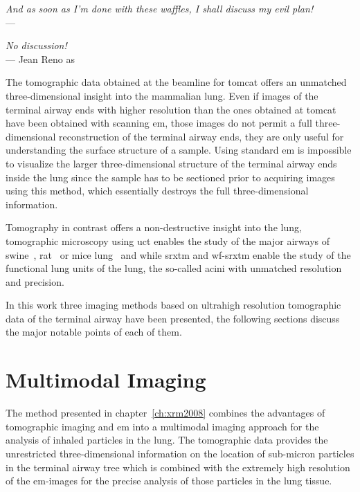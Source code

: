 \acresetall
{}\label{ch:discussion}
\begin{flushright}{\slshape And as soon as I'm done with these waffles, I shall discuss my evil  plan!} \\ \medskip
    ---  \citep{Zim}
\end{flushright}
\begin{flushright}{\slshape No discussion!} \\ \medskip
    --- Jean Reno as \citep{Leon}
\end{flushright}
\vspace{52mm}
The tomographic data obtained at the beamline for \ac{tomcat} offers an unmatched three-dimensional insight into the mammalian lung. Even if images of the terminal airway ends with higher resolution than the ones obtained at \ac{tomcat} have been obtained with scanning \ac{em}, those images do not permit a full three-dimensional reconstruction of the terminal airway ends, they are only useful for understanding the surface structure of a sample. Using standard \ac{em} is impossible to visualize the larger three-dimensional structure of the terminal airway ends inside the lung since the sample has to be sectioned prior to acquiring images using this method, which essentially destroys the full three-dimensional information.

Tomography in contrast offers a non-destructive insight into the lung, tomographic microscopy using \ac{uct} enables the study of the major airways of swine~\cite{Litzlbauer2006}, rat~\cite{Langheinrich2004a,Sharif2010} or mice lung~\cite{Langheinrich2004,Ritman2005} and while \ac{srxtm} and \ac{wf-srxtm} enable the study of the functional lung units of the lung, the so-called acini with unmatched resolution and precision.

In this work three imaging methods based on ultrahigh resolution tomographic data of the terminal airway have been presented, the following sections discuss the major notable points of each of them.

\section{Multimodal Imaging}
The method presented in chapter~\ref{ch:xrm2008} combines the advantages of tomographic imaging and \ac{em} into a multimodal imaging approach for the analysis of inhaled particles in the lung. The tomographic data provides the unrestricted three-dimensional information on the location of sub-micron particles in the terminal airway tree which is combined with the extremely high resolution of the \ac{em}-images for the precise analysis of those particles in the lung tissue.

